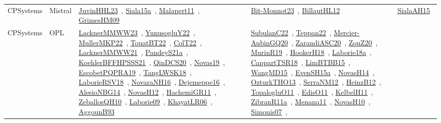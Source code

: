 {\begin{longtable}{lp{3cm}>{\raggedright\arraybackslash}p{6cm}>{\raggedright\arraybackslash}p{6cm}>{\raggedright\arraybackslash}p{8cm}}
CPSystems & Mistral & \href{works/JuvinHHL23.pdf}{JuvinHHL23}~\cite{JuvinHHL23}, \href{works/Siala15a.pdf}{Siala15a}~\cite{Siala15a}, \href{works/Malapert11.pdf}{Malapert11}~\cite{Malapert11}, \href{works/GrimesHM09.pdf}{GrimesHM09}~\cite{GrimesHM09} & \href{works/Bit-Monnot23.pdf}{Bit-Monnot23}~\cite{Bit-Monnot23}, \href{works/BillautHL12.pdf}{BillautHL12}~\cite{BillautHL12} & \href{works/SialaAH15.pdf}{SialaAH15}~\cite{SialaAH15}\\
CPSystems & OPL & \href{works/LacknerMMWW23.pdf}{LacknerMMWW23}~\cite{LacknerMMWW23}, \href{works/YunusogluY22.pdf}{YunusogluY22}~\cite{YunusogluY22}, \href{works/MullerMKP22.pdf}{MullerMKP22}~\cite{MullerMKP22}, \href{works/TouatBT22.pdf}{TouatBT22}~\cite{TouatBT22}, \href{works/ColT22.pdf}{ColT22}~\cite{ColT22}, \href{works/LacknerMMWW21.pdf}{LacknerMMWW21}~\cite{LacknerMMWW21}, \href{works/PandeyS21a.pdf}{PandeyS21a}~\cite{PandeyS21a}, \href{works/KoehlerBFFHPSSS21.pdf}{KoehlerBFFHPSSS21}~\cite{KoehlerBFFHPSSS21}, \href{works/QinDCS20.pdf}{QinDCS20}~\cite{QinDCS20}, \href{works/Novas19.pdf}{Novas19}~\cite{Novas19}, \href{works/EscobetPQPRA19.pdf}{EscobetPQPRA19}~\cite{EscobetPQPRA19}, \href{works/TangLWSK18.pdf}{TangLWSK18}~\cite{TangLWSK18}, \href{works/LaborieRSV18.pdf}{LaborieRSV18}~\cite{LaborieRSV18}, \href{works/NovaraNH16.pdf}{NovaraNH16}~\cite{NovaraNH16}, \href{works/Dejemeppe16.pdf}{Dejemeppe16}~\cite{Dejemeppe16}, \href{works/AlesioNBG14.pdf}{AlesioNBG14}~\cite{AlesioNBG14}, \href{works/NovasH12.pdf}{NovasH12}~\cite{NovasH12}, \href{works/HachemiGR11.pdf}{HachemiGR11}~\cite{HachemiGR11}, \href{works/ZeballosQH10.pdf}{ZeballosQH10}~\cite{ZeballosQH10}, \href{works/Laborie09.pdf}{Laborie09}~\cite{Laborie09}, \href{works/KhayatLR06.pdf}{KhayatLR06}~\cite{KhayatLR06}, \href{works/AggounB93.pdf}{AggounB93}~\cite{AggounB93} & \href{works/SubulanC22.pdf}{SubulanC22}~\cite{SubulanC22}, \href{works/Teppan22.pdf}{Teppan22}~\cite{Teppan22}, \href{works/Mercier-AubinGQ20.pdf}{Mercier-AubinGQ20}~\cite{Mercier-AubinGQ20}, \href{works/ZarandiASC20.pdf}{ZarandiASC20}~\cite{ZarandiASC20}, \href{works/ZouZ20.pdf}{ZouZ20}~\cite{ZouZ20}, \href{works/MurinR19.pdf}{MurinR19}~\cite{MurinR19}, \href{works/HookerH18.pdf}{HookerH18}~\cite{HookerH18}, \href{works/Laborie18a.pdf}{Laborie18a}~\cite{Laborie18a}, \href{works/CappartTSR18.pdf}{CappartTSR18}~\cite{CappartTSR18}, \href{works/LimBTBB15.pdf}{LimBTBB15}~\cite{LimBTBB15}, \href{works/WangMD15.pdf}{WangMD15}~\cite{WangMD15}, \href{works/EvenSH15a.pdf}{EvenSH15a}~\cite{EvenSH15a}, \href{works/NovasH14.pdf}{NovasH14}~\cite{NovasH14}, \href{works/OzturkTHO13.pdf}{OzturkTHO13}~\cite{OzturkTHO13}, \href{works/SerraNM12.pdf}{SerraNM12}~\cite{SerraNM12}, \href{works/HeinzB12.pdf}{HeinzB12}~\cite{HeinzB12}, \href{works/TopalogluO11.pdf}{TopalogluO11}~\cite{TopalogluO11}, \href{works/EdisO11.pdf}{EdisO11}~\cite{EdisO11}, \href{works/KelbelH11.pdf}{KelbelH11}~\cite{KelbelH11}, \href{works/ZibranR11a.pdf}{ZibranR11a}~\cite{ZibranR11a}, \href{works/Menana11.pdf}{Menana11}~\cite{Menana11}, \href{works/NovasH10.pdf}{NovasH10}~\cite{NovasH10}, \href{works/Simonis07.pdf}{Simonis07}~\cite{Simonis07}, 
\end{longtable}}
